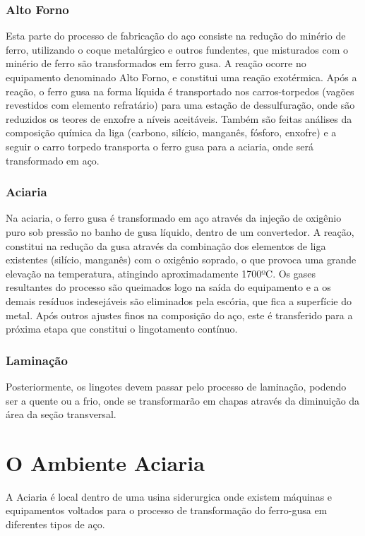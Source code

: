 \subsubsection{Alto Forno}
Esta parte do processo de fabricação do aço consiste na redução do minério de ferro, utilizando o coque metalúrgico e outros fundentes, que misturados com o minério de ferro são transformados em ferro gusa. A reação ocorre no equipamento denominado Alto Forno, e constitui uma reação exotérmica. Após a reação, o ferro gusa na forma líquida é transportado nos carros-torpedos (vagões revestidos com elemento refratário) para uma estação de dessulfuração, onde são reduzidos os teores de enxofre a níveis aceitáveis. Também são feitas análises da composição química da liga (carbono, silício, manganês, fósforo, enxofre) e a seguir o carro torpedo transporta o ferro gusa para a aciaria, onde será transformado em aço.

\subsubsection{Aciaria}
Na aciaria, o ferro gusa é transformado em aço através da injeção de oxigênio puro sob pressão no banho de gusa líquido, dentro de um convertedor. A reação, constitui na redução da gusa através da combinação dos elementos de liga existentes (silício, manganês) com o oxigênio soprado, o que provoca uma grande elevação na temperatura, atingindo aproximadamente 1700ºC.
Os gases resultantes do processo são queimados logo na saída do equipamento e a os demais resíduos indesejáveis são eliminados pela escória, que fica a superfície do metal.
Após outros ajustes finos na composição do aço, este é transferido para a próxima etapa que constitui o lingotamento contínuo. 

\subsubsection{Laminação}
Posteriormente, os lingotes devem passar pelo processo de laminação, podendo ser a quente ou a frio, onde se transformarão em chapas através da diminuição da área da seção transversal.


\section{O Ambiente Aciaria}
A Aciaria é local dentro de uma usina siderurgica onde existem máquinas e equipamentos voltados para o processo de transformação do ferro-gusa em diferentes tipos de aço. \cite{IBS}

